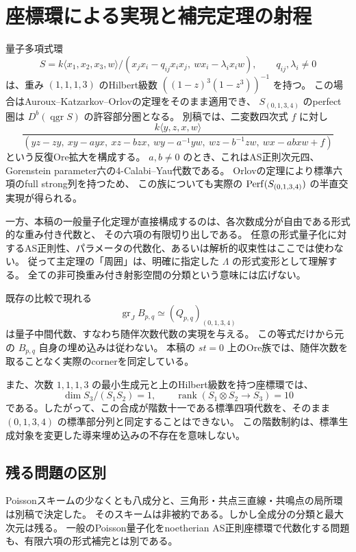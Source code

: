 \section{座標環による実現と補完定理の射程}

量子多項式環
\[
 S=k\langle x_1,x_2,x_3,w\rangle/
 (x_jx_i-q_{ij}x_ix_j,\ wx_i-\lambda_i x_iw),
 \qquad q_{ij},\lambda_i\ne0
\]
は、重み $(1,1,1,3)$ のHilbert級数
$((1-z)^3(1-z^3))^{-1}$ を持つ。
この場合はAuroux--Katzarkov--Orlovの定理をそのまま適用でき、
$S_{(0,1,3,4)}$ のperfect圏は $D^b(\operatorname{qgr}S)$ の許容部分圏となる。
別稿\cite{VKPoisson32}では、二変数四次式 $f$ に対し
\[
 \frac{k\langle y,z,x,w\rangle}{
 (yz-zy,\ xy-ayx,\ xz-bzx,\ wy-a^{-1}yw,\ wz-b^{-1}zw,\ wx-abxw+f)}
\]
という反復Ore拡大を構成する。
$a,b\ne0$ のとき、これはAS正則次元四、Gorenstein parameter六の4-Calabi--Yau代数である。
Orlovの定理\cite[Corollary 2.7]{Orlov2009}により標準六項のfull strong列を持つため、
この族についても実際の $\operatorname{Perf}(S_{(0,1,3,4)})$ の半直交実現が得られる。

一方、本稿の一般量子化定理が直接構成するのは、各次数成分が自由である形式的な重み付き代数と、
その六項の有限切り出しである。
任意の形式量子化に対するAS正則性、パラメータの代数化、あるいは解析的収束性はここでは使わない。
従って主定理の「周囲」は、明確に指定した $\Lambda$ の形式変形として理解する。
全ての非可換重み付き射影空間の分類という意味には広げない。

既存の比較で現れる
\[
 \operatorname{gr}_J B_{p,q}\simeq(Q_{p,q})_{(0,1,3,4)}
\]
は量子中間代数、すなわち随伴次数代数の実現を与える。
この等式だけから元の $B_{p,q}$ 自身の埋め込みは従わない。
本稿の $st=0$ 上のOre族では、随伴次数を取ることなく実際のcornerを同定している。

また、次数 $1,1,1,3$ の最小生成元と上のHilbert級数を持つ座標環では、
\[
 \dim S_3/(S_1S_2)=1,\qquad
 \operatorname{rank}(S_1\otimes S_2\longrightarrow S_3)=10
\]
である。したがって、この合成が階数十一である標準四項代数を、そのまま
$(0,1,3,4)$ の標準部分列と同定することはできない。
この階数制約は、標準生成対象を変更した導来埋め込みの不存在を意味しない。


\subsection{残る問題の区別}
Poissonスキームの少なくとも八成分と、三角形・共点三直線・共鳴点の局所環は別稿で決定した。
そのスキームは非被約である。しかし全成分の分類と最大次元は残る。
一般のPoisson量子化をnoetherian AS正則座標環で代数化する問題も、有限六項の形式補完とは別である。

